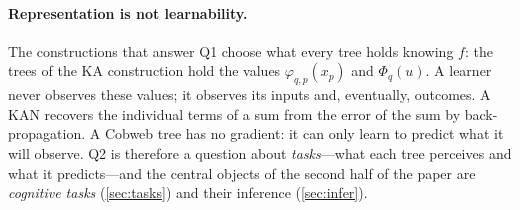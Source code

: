 \documentclass[11pt]{article}
\theoremstyle{definition}
\theoremstyle{remark}
\begin{document}
\paragraph{Representation is not learnability.}
The constructions that answer Q1 choose what every tree holds knowing $f$: the trees of
the KA construction hold the values $\varphi_{q,p}(x_p)$ and $\Phi_q(u)$.  A learner never
observes these values; it observes its inputs and, eventually, outcomes.  A KAN recovers
the individual terms of a sum from the error of the sum by back-propagation.  A Cobweb
tree has no gradient: it can only learn to predict what it will observe.  Q2 is
therefore a question about \emph{tasks}---what each tree perceives and what it
predicts---and the central objects of the second half of the paper are \emph{cognitive
tasks} (\cref{sec:tasks}) and their inference (\cref{sec:infer}).
\end{document}
